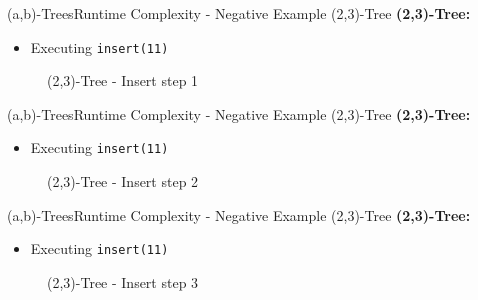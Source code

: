 
\begin{frame}{(a,b)-Trees}{Runtime Complexity - Negative Example (2,3)-Tree}
  \textbf{(2,3)-Tree:}
  \begin{itemize}
    \item<2->
      Executing \texttt{\color{Mittel-Blau}insert(11)}
  \end{itemize}
  \begin{figure}
    \begin{adjustbox}{width=0.7\linewidth}
      
    \end{adjustbox}
    \label{fig:a_b_tree:2_3_tree_6}
    \caption{(2,3)-Tree - Insert step 1}
  \end{figure}
\end{frame}


\begin{frame}{(a,b)-Trees}{Runtime Complexity - Negative Example (2,3)-Tree}
  \textbf{(2,3)-Tree:}
  \begin{itemize}
    \item
      Executing \texttt{\color{Mittel-Blau}insert(11)}
  \end{itemize}
  \begin{figure}
    \begin{adjustbox}{width=0.7\linewidth}
      
    \end{adjustbox}
    \label{fig:a_b_tree:2_3_tree_7}
    \caption{(2,3)-Tree - Insert step 2}
  \end{figure}
\end{frame}


\begin{frame}{(a,b)-Trees}{Runtime Complexity - Negative Example (2,3)-Tree}
  \textbf{(2,3)-Tree:}
  \begin{itemize}
    \item
      Executing \texttt{\color{Mittel-Blau}insert(11)}
  \end{itemize}
  \begin{figure}
    \begin{adjustbox}{width=0.7\linewidth}
      
    \end{adjustbox}
    \label{fig:a_b_tree:2_3_tree_8}
    \caption{(2,3)-Tree - Insert step 3}
  \end{figure}
\end{frame}

